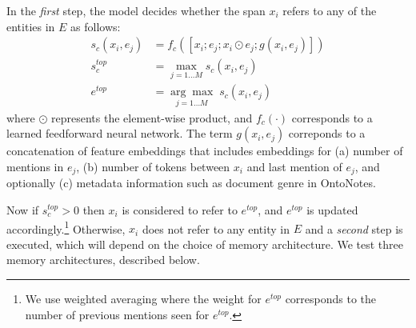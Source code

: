 \documentclass[12pt]{thesis-umich}[thesis]
\begin{document}
In the \emph{first} step, the model decides whether the span $x_i$ refers to any of the entities in $E$ as follows:
\begin{align*}
s_c(x_i, e_j) &\!=\! f_c([x_i; e_j; x_i \odot e_j; g(x_i, e_j)])\\ s_c^{\mathit{top}} &\!=\! \max_{j=1 \dotsc M} s_c(x_i, e_j)\\
e^{\mathit{top}} &\!=\! \underset{{j=1 \dotsc M}}{\arg\max}\; s_c(x_i, e_j)
\end{align*} where $\odot$ represents the element-wise product, and $f_c(\cdot)$ corresponds to a learned feedforward neural network.
The term $g(x_i, e_j)$ correponds to a concatenation of feature embeddings that includes embeddings for (a) number of mentions in $e_j$, (b) number of tokens between $x_i$ and last mention of $e_j$, and optionally (c) metadata information such as document genre in OntoNotes. 

Now if $s_c^{\mathit{top}} > 0$ then $x_i$ is considered to refer to $e^{\mathit{top}}$, and $e^{\mathit{top}}$ is updated accordingly.\footnote{We use weighted averaging where the weight for $e^{\mathit{top}}$ corresponds to the number of previous mentions seen for  $e^{\mathit{top}}$.}
Otherwise, $x_i$ does not refer to any entity in $E$ and a \emph{second} step is executed, which will depend on the choice of memory architecture.
We test three
 memory architectures, described below.
\end{document}
